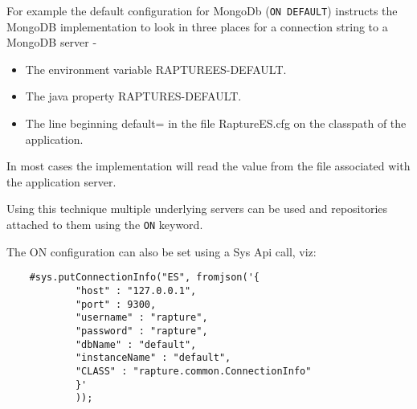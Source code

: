 For example the default configuration for MongoDb (\verb+ON DEFAULT+) instructs the MongoDB implementation
to look in three places for a connection string to a MongoDB server -

\begin{itemize}
\item{The environment variable RAPTUREES-DEFAULT.}
\item{The java property RAPTURES-DEFAULT.}
\item{The line beginning default= in the file RaptureES.cfg on the classpath of the application.}
\end{itemize}

In most cases the implementation will read the value from the file associated with the application server.

Using this technique multiple underlying servers can be used and repositories attached to them using the
\verb+ON+ keyword.

The ON configuration can also be set using a Sys Api call, viz:

\begin{lstlisting}
	#sys.putConnectionInfo("ES", fromjson('{
			"host" : "127.0.0.1",
			"port" : 9300,
			"username" : "rapture",
			"password" : "rapture",
			"dbName" : "default",
			"instanceName" : "default",
			"CLASS" : "rapture.common.ConnectionInfo"
			}'
			));
\end{lstlisting}
